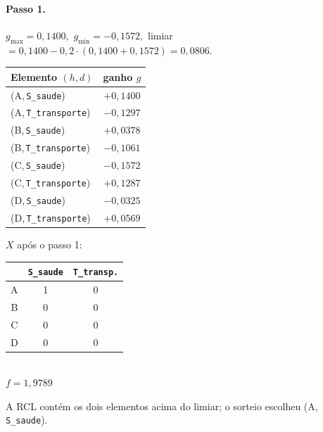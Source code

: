 \documentclass[11pt,a4paper]{article}
\newcommand{\hex}[1]{\textsf{#1}}
\begin{document}
\paragraph{Passo 1.}
$g_{\max}=0{,}1400$,\ $g_{\min}=-0{,}1572$,\ limiar
$=0{,}1400-0{,}2\cdot(0{,}1400+0{,}1572)=0{,}0806$.

\begin{minipage}[t]{0.55\textwidth}
\centering
\small
\begin{tabular}{@{}lc@{}}
\toprule
Elemento $(h,d)$ & ganho $g$ \\
\midrule
\rowcolor{cellsel}(\hex{A},\,\texttt{S\_saude})      & $+0{,}1400$ \\
(\hex{A},\,\texttt{T\_transporte})                   & $-0{,}1297$ \\
(\hex{B},\,\texttt{S\_saude})                        & $+0{,}0378$ \\
(\hex{B},\,\texttt{T\_transporte})                   & $-0{,}1061$ \\
(\hex{C},\,\texttt{S\_saude})                        & $-0{,}1572$ \\
\rowcolor{cellrcl}(\hex{C},\,\texttt{T\_transporte}) & $+0{,}1287$ \\
(\hex{D},\,\texttt{S\_saude})                        & $-0{,}0325$ \\
(\hex{D},\,\texttt{T\_transporte})                   & $+0{,}0569$ \\
\bottomrule
\end{tabular}
\end{minipage}
\hfill
\begin{minipage}[t]{0.40\textwidth}
\centering
\small
\vspace{2pt}
$X$ após o passo 1:\\[4pt]
\begin{tabular}{@{}c cc@{}}
\toprule
 & \texttt{S\_saude} & \texttt{T\_transp.} \\
\midrule
\hex{A} & \cellcolor{cellchg}1 & 0 \\
\hex{B} & 0 & 0 \\
\hex{C} & 0 & 0 \\
\hex{D} & 0 & 0 \\
\bottomrule
\end{tabular}\\[4pt]
$f = 1{,}9789$
\end{minipage}

\medskip
A RCL contém os dois elementos acima do limiar; o sorteio escolheu
(\hex{A},\,\texttt{S\_saude}).

\end{document}
